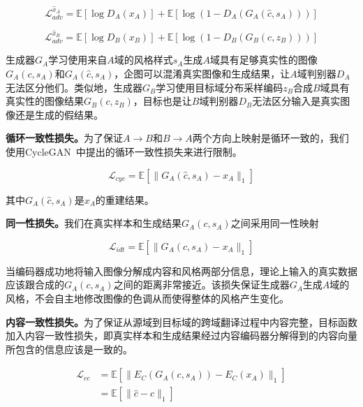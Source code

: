 \begin{equation}
\label{equ:adv_a}
\mathcal{L}_{adv}^{\hat{x}_A} = \mathbb{E}[\log D_A(x_A)] + \mathbb{E}[\log(1-D_A(G_A(\hat{c},s_A)))]
\end{equation}

\begin{equation}
\label{equ:adv_b}
\mathcal{L}_{adv}^{\hat{x}_B} = \mathbb{E}[\log D_B(x_B)] + \mathbb{E}[\log(1-D_B(G_B(c,z_B)))]
\end{equation}

生成器$G_A$学习使用来自$A$域的风格样式$s_A$生成$A$域具有足够真实性的图像$G_A(c,s_A)$和$G_A(\hat{c},s_A)$，企图可以混淆真实图像和生成结果，让$A$域判别器$D_A$无法区分他们。类似地，生成器$G_B$学习使用目标域分布采样编码$z_B$合成$B$域具有真实性的图像结果$G_B(c,z_B)$，目标也是让$B$域判别器$D_B$无法区分输入是真实图像还是生成的假结果。

\textbf{循环一致性损失。}为了保证$A \rightarrow B$和$B \rightarrow A$两个方向上映射是循环一致的，我们使用CycleGAN~\cite{zhu2017unpaired}中提出的循环一致性损失来进行限制。

\begin{equation}
\label{equ:cycle}
\mathcal{L}_{cyc} = \mathbb{E}[\| G_A(\hat{c}, s_A) - x_A \|_1]
\end{equation}

其中$G_A(\hat{c}, s_A)$是$x_A$的重建结果。

\textbf{同一性损失。}我们在真实样本和生成结果$G_A(c,s_A)$之间采用同一性映射

\begin{equation}
\label{equ:idt}
\mathcal{L}_{idt} = \mathbb{E}[\| G_A(c, s_A) - x_A \|_1]
\end{equation}

当编码器成功地将输入图像分解成内容和风格两部分信息，理论上输入的真实数据应该跟合成的$G_A(c,s_A)$之间的距离非常接近。该损失保证生成器$G_A$生成$A$域的风格，不会自主地修改图像的色调从而使得整体的风格产生变化。

\textbf{内容一致性损失。}为了保证从源域到目标域的跨域翻译过程中内容完整，目标函数加入内容一致性损失，即真实样本和生成结果经过内容编码器分解得到的内容向量所包含的信息应该是一致的。

\begin{equation}
\label{equ:cc}
\begin{aligned}
\mathcal{L}_{cc} & = \mathbb{E}[\| E_C(G_A(c, s_A)) - E_C(x_A) \|_1] \\
       & = \mathbb{E}[\| \hat{c} - c \|_1]
\end{aligned}
\end{equation}

